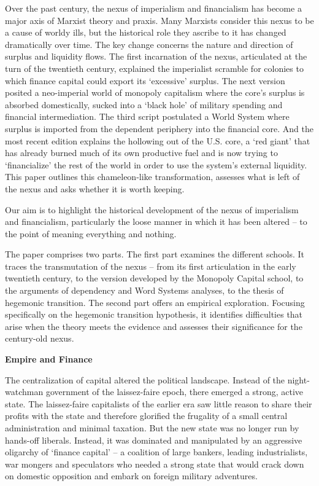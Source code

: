 \documentclass[
]{book}
\begin{document}
Over the past century, the nexus of imperialism and financialism has become a major axis
of Marxist theory and praxis. Many Marxists consider this nexus to be a cause of worldy
ills, but the historical role they ascribe to it has changed dramatically over time. The key
change concerns the nature and direction of surplus and liquidity flows. The first
incarnation of the nexus, articulated at the turn of the twentieth century, explained the
imperialist scramble for colonies to which finance capital could export its `excessive'
surplus. The next version posited a neo-imperial world of monopoly capitalism where the
core's surplus is absorbed domestically, sucked into a `black hole' of military spending
and financial intermediation. The third script postulated a World System where surplus is
imported from the dependent periphery into the financial core. And the most recent
edition explains the hollowing out of the U.S. core, a `red giant' that has already burned
much of its own productive fuel and is now trying to `financialize' the rest of the world in
order to use the system's external liquidity. This paper outlines this chameleon-like
transformation, assesses what is left of the nexus and asks whether it is worth keeping.

Our aim is to highlight the historical development of the
nexus of imperialism and financialism,
particularly the loose manner in which it has been altered --
to the point of meaning everything and nothing.

The paper comprises two parts. The first part examines the different schools. It
traces the transmutation of the nexus -- from its first articulation in the early twentieth
century, to the version developed by the Monopoly Capital school, to the arguments of
dependency and Word Systems analyses, to the thesis of hegemonic transition. The
second part offers an empirical exploration. Focusing specifically on the hegemonic
transition hypothesis, it identifies difficulties that arise when the theory meets the
evidence and assesses their significance for the century-old nexus.

\textbf{Empire and Finance}

The centralization of capital altered the political landscape. Instead of
the night-watchman government of the laissez-faire epoch, there emerged a strong, active
state.
The laissez-faire capitalists of the earlier era saw little reason to share their profits
with the state and therefore glorified the frugality of a small central administration and
minimal taxation. But the new state was no longer run by hands-off liberals. Instead, it was
dominated and manipulated by an aggressive oligarchy of `finance capital' -- a coalition of
large bankers, leading industrialists, war mongers and speculators who needed a strong
state that would crack down on domestic opposition and embark on foreign military
adventures.
\end{document}
